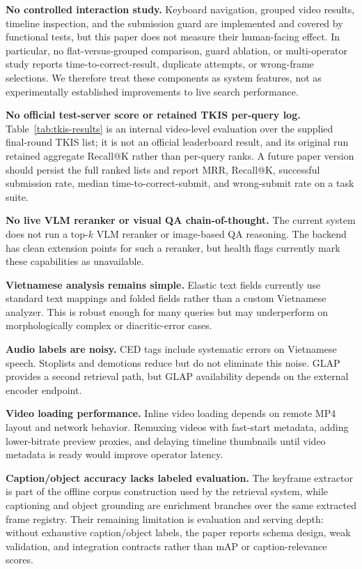 \documentclass[conference]{IEEEtran}
\begin{document}
\textbf{No controlled interaction study.} Keyboard navigation, grouped video
results, timeline inspection, and the submission guard are implemented and
covered by functional tests, but this paper does not measure their human-facing
effect. In particular, no flat-versus-grouped comparison, guard ablation, or
multi-operator study reports time-to-correct-result, duplicate attempts, or
wrong-frame selections. We therefore treat these components as system features,
not as experimentally established improvements to live search performance.

\textbf{No official test-server score or retained TKIS per-query log.}
Table~\ref{tab:tkis-results}
is an internal video-level evaluation over the supplied final-round TKIS list;
it is not an official leaderboard result, and its original run retained
aggregate Recall@K rather than per-query ranks. A future paper version should
persist the full ranked lists and report MRR,
Recall@K, successful submission rate, median time-to-correct-submit, and
wrong-submit rate on a task suite.

\textbf{No live VLM reranker or visual QA chain-of-thought.} The current system
does not run a top-$k$ VLM reranker or image-based QA reasoning. The backend has
clean extension points for such a reranker, but health flags currently mark
these capabilities as unavailable.

\textbf{Vietnamese analysis remains simple.} Elastic text fields currently use
standard text mappings and folded fields rather than a custom Vietnamese
analyzer. This is robust enough for many queries but may underperform on
morphologically complex or diacritic-error cases.

\textbf{Audio labels are noisy.} CED tags include systematic errors on
Vietnamese speech. Stoplists and demotions reduce but do not eliminate this
noise. GLAP provides a second retrieval path, but GLAP availability depends on
the external encoder endpoint.

\textbf{Video loading performance.} Inline video loading depends on remote MP4
layout and network behavior. Remuxing videos with fast-start metadata, adding
lower-bitrate preview proxies, and delaying timeline thumbnails until video
metadata is ready would improve operator latency.

\textbf{Caption/object accuracy lacks labeled evaluation.} The keyframe
extractor is part of the offline corpus construction used by the retrieval
system, while captioning and object grounding are enrichment branches over the
same extracted frame registry. Their remaining limitation is evaluation and
serving depth: without exhaustive caption/object labels, the paper reports
schema design, weak validation, and integration contracts rather than mAP or
caption-relevance scores.
\end{document}
